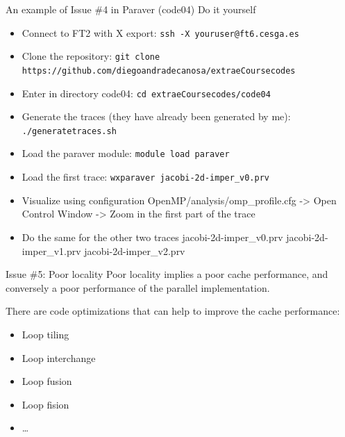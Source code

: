 \documentclass[10pt,xcolor=table]{beamer}
\begin{document}
\begin{frame}{An example of Issue \#4 in Paraver (code04)}
Do it yourself
\begin{itemize}
    \item Connect to FT2 with X export: {\tt ssh -X youruser@ft6.cesga.es}
    \item Clone the repository: {\tt git clone https://github.com/diegoandradecanosa/extraeCoursecodes}
    \item Enter in directory code04: {\tt cd extraeCoursecodes/code04}
    \item Generate the traces (they have already been generated by me): {\tt ./generatetraces.sh}
    \item Load the paraver module:  {\tt module load paraver}
    \item Load the first trace: {\tt wxparaver jacobi-2d-imper\_v0.prv}
    \item Visualize using configuration OpenMP/analysis/omp\_profile.cfg -> Open Control Window -> Zoom in the first part of the trace
    \item Do the same for the other two traces jacobi-2d-imper\_v0.prv jacobi-2d-imper\_v1.prv jacobi-2d-imper\_v2.prv
\end{itemize}
\end{frame}


\begin{frame}{Issue \#5: Poor locality}
Poor locality implies a poor cache performance, and conversely a poor performance of the parallel implementation. 

There are code optimizations that can help to improve the cache performance:
\begin{itemize}
    \item Loop tiling
    \item Loop interchange
    \item Loop fusion
    \item Loop fision
    \item \ldots
\end{itemize}
\end{frame}
\end{document}
